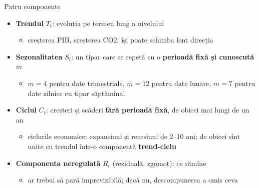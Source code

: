 \begin{frame}{Patru componente}
\itemsize{\small}
\begin{itemize}
    \item \textbf{Trendul} $T_t$: evoluția pe termen lung a nivelului
    \begin{itemize}
        \item creșterea PIB, creșterea CO2; își poate schimba lent direcția
    \end{itemize}
    \item \textbf{Sezonalitatea} $S_t$: un tipar care se repetă cu o \textbf{perioadă fixă și cunoscută} $m$
    \begin{itemize}
        \item $m = 4$ pentru date trimestriale, $m = 12$ pentru date lunare, $m = 7$ pentru date zilnice cu tipar săptămînal
    \end{itemize}
    \item \textbf{Ciclul} $C_t$: creșteri și scăderi \textbf{fără perioadă fixă}, de obicei mai lungi de un an
    \begin{itemize}
        \item ciclurile economice: expansiuni și recesiuni de 2--10 ani; de obicei sînt unite cu trendul într-o componentă \textbf{trend-ciclu}
    \end{itemize}
    \item \textbf{Componenta neregulată} $R_t$ (reziduală, zgomot): ce rămîne
    \begin{itemize}
        \item ar trebui să pară imprevizibilă; dacă nu, descompunerea a omis ceva
    \end{itemize}
\end{itemize}
\end{frame}

